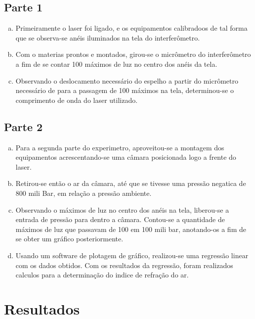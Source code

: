 \documentclass[a4paper, 12pt]{article}
\begin{document}
\subsection{Parte 1}
\begin{enumerate}[(a)]
    \item Primeiramente o laser foi ligado, e os equipamentos calibradoos de tal forma
          que se observa-se anéis iluminados na tela do interferômetro.
    \item Com o materias prontos e montados, girou-se o micrômetro do interferômetro a
          fim de se contar 100 máximos de luz no centro dos anéis da tela.
    \item Observando o deslocamento necessário do espelho a partir do micrômetro
          necessário de para a passagem de 100 máximos na tela, determinou-se o
          comprimento de onda do laser utilizado.
\end{enumerate}

\subsection{Parte 2}
\begin{enumerate}[(a)]
    \item Para a segunda parte do experimetro, aproveitou-se a montagem dos equipamentos
          acrescentando-se uma câmara posicionada logo a frente do laser.
    \item Retirou-se então o ar da câmara, até que se tivesse uma pressão negatica de 800
          mili Bar, em relação a pressão ambiente.
    \item Observando o máximos de luz no centro dos anéis na tela, liberou-se a entrada
          de pressão para dentro a câmara. Contou-se a quantidade de máximos de luz que
          passavam de 100 em 100 mili bar, anotando-os a fim de se obter um gráfico
          posteriormente.
    \item Usando um software de plotagem de gráfico, realizou-se uma regressão linear com
          os dados obtidos. Com os resultados da regressão, foram realizados calculos
          para a determinação do indice de refração do ar.
\end{enumerate}

\section{Resultados}
\end{document}
